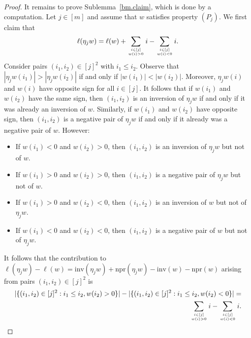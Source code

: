 \documentclass[11pt,a4paper]{amsart}
\theoremstyle{plain}
\theoremstyle{remark}
\begin{document}
\begin{proof}
It remains to prove Sublemma~\ref{bm.claim}, which is done by a computation.  Let $j \in [m]$ and assume that $w$ satisfies property $(P_j)$.  We first claim that
\begin{equation} \label{equ:sublemma.length}
\ell(\eta_j w) = \ell (w) + \sum_{i \in [j] \atop w(i) > 0} i - \sum_{i \in [j] \atop w(i) < 0} i.
\end{equation} 
Consider pairs $(i_1, i_2) \in [j]^2$ with $i_1 \leq i_2$.  Observe that $|\eta_j w(i_1)| > |\eta_j w(i_2)|$ if and only if $| w(i_1)| < |w(i_2)|$.  Moreover, $\eta_j w(i)$ and $w(i)$ have opposite sign for all $i \in [j]$.  It follows that if $w(i_1)$ and $w(i_2)$ have the same sign, then $(i_1, i_2)$ is an inversion of $\eta_j w$ if and only if it was already an inversion of $w$.  Similarly, if $w(i_1)$ and $w(i_2)$ have opposite sign, then $(i_1, i_2)$ is a negative pair of $\eta_j w$ if and only if it already was a negative pair of $w$.  However:
\begin{itemize}
\item If $w(i_1) < 0$ and $w(i_2) > 0$, then $(i_1, i_2)$ is an inversion of $\eta_j w$ but not of $w$.
\item If $w(i_1) > 0$ and $w(i_2) > 0$, then $(i_1, i_2)$ is a negative pair of $\eta_j w$ but not of $w$.
\item If $w(i_1) > 0$ and $w(i_2) < 0$, then $(i_1, i_2)$ is an inversion of $w$ but not of $\eta_j w$.
\item If $w(i_1) < 0$ and $w(i_2) < 0$, then $(i_1, i_2)$ is a negative pair of $w$ but not of $\eta_j w$.
\end{itemize}
It follows that the contribution to $\ell(\eta_j w) - \ell(w) = \mathrm{inv}(\eta_j w) + \mathrm{npr}(\eta_j w) - \mathrm{inv}(w) - \mathrm{npr}(w)$ arising from pairs $(i_1, i_2) \in [j]^2$ is
\begin{align*}
| \{ (i_1, i_2) \in [j]^2: i_1 \leq i_2, w(i_2) > 0 \} | - | \{ (i_1, i_2) \in [j]^2: i_1 \leq i_2, w(i_2) < 0 \} | = \\\sum_{i \in [j] \atop w(i) > 0} i - \sum_{i \in [j] \atop w(i) < 0} i.
\end{align*}


\end{proof}
\end{document}
